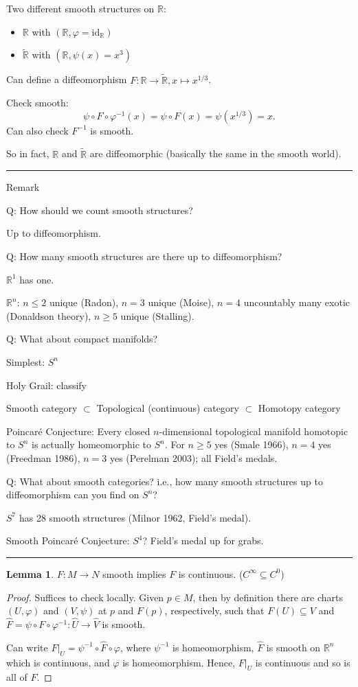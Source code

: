 \documentclass[12pt]{article}
\newcommand{\sepline}{\rule{\textwidth}{0.4pt}}
\theoremstyle{definition}
\newtheorem{lemma}{Lemma}
\newcommand{\R}{\mathbb{R}}
\renewcommand{\phi}{\varphi}
\newcommand{\<}{\left\langle}
\renewcommand{\>}{\right\rangle}
\newcommand{\seq}{\subseteq}
\newcommand{\id}{\mathrm{id}}
\renewcommand{\hat}{\widehat}
\renewcommand{\tilde}{\widetilde}
\begin{document}
Two different smooth structures on $\R$: 
\begin{itemize}
    \item $\R$ with $(\R, \phi = \id_\R)$
    \item $\tilde{\R}$ with $(\R, \psi(x) = x^3)$
\end{itemize}
Can define a diffeomorphism $F : \R \to \tilde{\R}, x \mapsto x^{1/3}$.

Check smooth:
\[
    \psi \circ F \circ \phi^{-1}(x)
        = \psi \circ F(x)
        = \psi(x^{1/3})
        = x.
\]
Can also check $F^{-1}$ is smooth.

So in fact, $\R$ and $\tilde{\R}$ are diffeomorphic (basically the same in the smooth world).

\sepline

Remark

Q: How should we count smooth structures?

Up to diffeomorphism.

Q: How many smooth structures are there up to diffeomorphism?

$\R^1$ has one.

$\R^n$: $n \leq 2$ unique (Radon), $n = 3$ unique (Moise), $n = 4$ uncountably many exotic (Donaldson theory), $n \geq 5$ unique (Stalling).


Q: What about compact manifolds?

Simplest: $S^n$

Holy Grail: classify

Smooth category $\subset$ Topological (continuous) category $\subset$ Homotopy category

Poincar\'e Conjecture: Every closed $n$-dimensional topological manifold homotopic to $S^n$ is actually homeomorphic to $S^n$.
For $n \geq 5$ yes (Smale 1966), $n = 4$ yes (Freedman 1986), $n = 3$ yes (Perelman 2003); all Field's medals.

Q: What about smooth categories?
i.e., how many smooth structures up to diffeomorphism can you find on $S^n$?

$S^7$ has 28 smooth structures (Milnor 1962, Field's medal).

Smooth Poincar\'e Conjecture: $S^4$? Field's medal up for grabs.


\sepline

\begin{lemma}
    $F : M \to N$ smooth implies $F$ is continuous.
    ($C^\infty \seq C^0$)
\end{lemma}

\begin{proof}
    Suffices to check locally.
    Given $p \in M$, then by definition there are charts $(U, \phi)$ and $(V, \psi)$ at $p$ and $F(p)$, respectively, such that $F(U) \seq V$ and $\hat{F} = \psi \circ F \circ \phi^{-1} : \hat{U} \to \hat{V}$ is smooth.
    
    Can write $F|_U = \psi^{-1} \circ \hat{F} \circ \phi$, where $\psi^{-1}$ is homeomorphism, $\hat{F}$ is smooth on $\R^n$ which is continuous, and $\phi$ is homeomorphism.
    Hence, $F|_U$ is continuous and so is all of $F$.
\end{proof}
\end{document}

